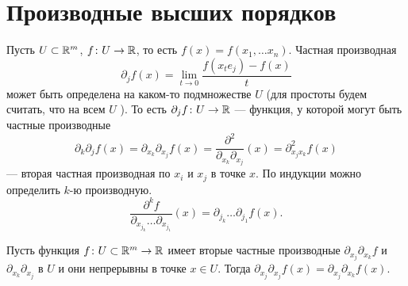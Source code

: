 % 
% 
%
\section{Производные высших порядков}
\begin{defn}
	Пусть $ U \subset \mathbb{R}^{m} $, $ f\colon U \to  \mathbb{R}$, то есть $ f(x) = f(x_1, \ldots x_{n})$. \textsf{Частная производная}
    \[
	\partial _jf(x)  = \lim_{t \to  0} \frac{f(x_t e_j) - f(x)}{t}
    \] 
    может быть определена на каком-то подмножестве $ U$ (для простоты будем считать, что на всем  $ U$ ). То есть $ \partial _j f \colon U \to \mathbb{R}$ --- функция, у которой могут быть частные производные
    \[
		\partial _k \partial _j f(x) =
		\partial _{x_k} \partial _{x_j}f(x) =
		\frac{\partial ^2}{\partial _{x_k} \partial _{x_j}} (x)= \partial ^2_{x_j x_k} f(x)
    \] --- вторая частная производная по $ x_i$ и  $ x_j$ в точке  $ x$. 
	По индукции можно определить  $ k$-ю производную.
	\[
		\frac{\partial ^{k} f}{ \partial _{ x_{j_k} } \ldots \partial _{x_{j_1}}  } (x) =
		\partial _{j_k} \ldots \partial _{j_1} f(x)
	.\] 
\end{defn}
\begin{thm}
Пусть функция $ f\colon U \subset \mathbb{R}^{m} \to  \mathbb{R}$ имеет вторые частные производные  $ \partial _{x_j} \partial _{x_k} f$
и $ \partial _{x_k} \partial _{x_j}$ в $ U$ и они непрерывны в точке   $ x \in U$. 
Тогда $ \partial _{x_j} \partial _{   x_j} f(x) = \partial _{x_j} \partial _{  x_{k}}f(x)$.
\end{thm}
